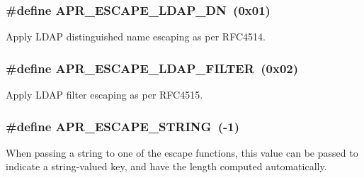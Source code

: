 \subsubsection[{\texorpdfstring{A\+P\+R\+\_\+\+E\+S\+C\+A\+P\+E\+\_\+\+L\+D\+A\+P\+\_\+\+DN}{APR_ESCAPE_LDAP_DN}}]{\setlength{\rightskip}{0pt plus 5cm}\#define A\+P\+R\+\_\+\+E\+S\+C\+A\+P\+E\+\_\+\+L\+D\+A\+P\+\_\+\+DN~(0x01)}\hypertarget{group__APR__Util__Escaping_gaf9f0f1e78bc6fef3358ceced2e738b39}{}\label{group__APR__Util__Escaping_gaf9f0f1e78bc6fef3358ceced2e738b39}
Apply L\+D\+AP distinguished name escaping as per R\+F\+C4514. 
\subsubsection[{\texorpdfstring{A\+P\+R\+\_\+\+E\+S\+C\+A\+P\+E\+\_\+\+L\+D\+A\+P\+\_\+\+F\+I\+L\+T\+ER}{APR_ESCAPE_LDAP_FILTER}}]{\setlength{\rightskip}{0pt plus 5cm}\#define A\+P\+R\+\_\+\+E\+S\+C\+A\+P\+E\+\_\+\+L\+D\+A\+P\+\_\+\+F\+I\+L\+T\+ER~(0x02)}\hypertarget{group__APR__Util__Escaping_gae42ad796afe5808eb98fc32c2345da0d}{}\label{group__APR__Util__Escaping_gae42ad796afe5808eb98fc32c2345da0d}
Apply L\+D\+AP filter escaping as per R\+F\+C4515. 
\subsubsection[{\texorpdfstring{A\+P\+R\+\_\+\+E\+S\+C\+A\+P\+E\+\_\+\+S\+T\+R\+I\+NG}{APR_ESCAPE_STRING}}]{\setlength{\rightskip}{0pt plus 5cm}\#define A\+P\+R\+\_\+\+E\+S\+C\+A\+P\+E\+\_\+\+S\+T\+R\+I\+NG~(-\/1)}\hypertarget{group__APR__Util__Escaping_ga793ae1b187ce490c65eeee2eb59d2831}{}\label{group__APR__Util__Escaping_ga793ae1b187ce490c65eeee2eb59d2831}
When passing a string to one of the escape functions, this value can be passed to indicate a string-\/valued key, and have the length computed automatically. 


